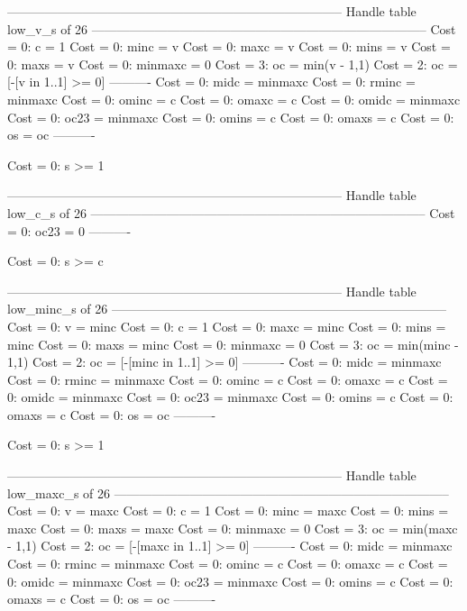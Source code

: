 --------------------------------------------------------------------------------
Handle table low_v_s of 26
--------------------------------------------------------------------------------
Cost =  0:  c       = 1
Cost =  0:  minc    = v
Cost =  0:  maxc    = v
Cost =  0:  mins    = v
Cost =  0:  maxs    = v
Cost =  0:  minmaxc = 0
Cost =  3:  oc      = min(v - 1,1)
Cost =  2:  oc      = [-[v in 1..1] >= 0]
----------
Cost =  0:  midc    = minmaxc
Cost =  0:  rminc   = minmaxc
Cost =  0:  ominc   = c
Cost =  0:  omaxc   = c
Cost =  0:  omidc   = minmaxc
Cost =  0:  oc23    = minmaxc
Cost =  0:  omins   = c
Cost =  0:  omaxs   = c
Cost =  0:  os      = oc
----------

Cost =  0:  s >= 1

--------------------------------------------------------------------------------
Handle table low_c_s of 26
--------------------------------------------------------------------------------
Cost =  0:  oc23 = 0
----------

Cost =  0:  s >= c

--------------------------------------------------------------------------------
Handle table low_minc_s of 26
--------------------------------------------------------------------------------
Cost =  0:  v       = minc
Cost =  0:  c       = 1
Cost =  0:  maxc    = minc
Cost =  0:  mins    = minc
Cost =  0:  maxs    = minc
Cost =  0:  minmaxc = 0
Cost =  3:  oc      = min(minc - 1,1)
Cost =  2:  oc      = [-[minc in 1..1] >= 0]
----------
Cost =  0:  midc    = minmaxc
Cost =  0:  rminc   = minmaxc
Cost =  0:  ominc   = c
Cost =  0:  omaxc   = c
Cost =  0:  omidc   = minmaxc
Cost =  0:  oc23    = minmaxc
Cost =  0:  omins   = c
Cost =  0:  omaxs   = c
Cost =  0:  os      = oc
----------

Cost =  0:  s >= 1

--------------------------------------------------------------------------------
Handle table low_maxc_s of 26
--------------------------------------------------------------------------------
Cost =  0:  v       = maxc
Cost =  0:  c       = 1
Cost =  0:  minc    = maxc
Cost =  0:  mins    = maxc
Cost =  0:  maxs    = maxc
Cost =  0:  minmaxc = 0
Cost =  3:  oc      = min(maxc - 1,1)
Cost =  2:  oc      = [-[maxc in 1..1] >= 0]
----------
Cost =  0:  midc    = minmaxc
Cost =  0:  rminc   = minmaxc
Cost =  0:  ominc   = c
Cost =  0:  omaxc   = c
Cost =  0:  omidc   = minmaxc
Cost =  0:  oc23    = minmaxc
Cost =  0:  omins   = c
Cost =  0:  omaxs   = c
Cost =  0:  os      = oc
----------

